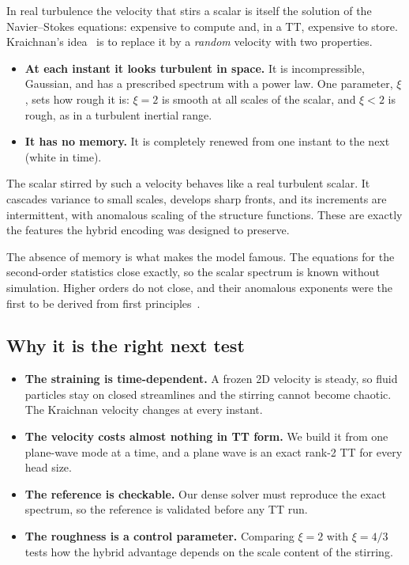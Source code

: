 \documentclass[aps,prfluids,reprint,onecolumn,amsmath,amssymb,nofootinbib,floatfix]{revtex4-2}
\begin{document}
In real turbulence the velocity that stirs a scalar is itself the solution of
the Navier--Stokes equations: expensive to compute and, in a TT, expensive to
store. Kraichnan's idea~\cite{Kraichnan1968,Kraichnan1994} is to replace it by a
\emph{random} velocity with two properties.
\begin{itemize}
\item \textbf{At each instant it looks turbulent in space.} It is incompressible,
      Gaussian, and has a prescribed spectrum with a power law. One parameter,
      $\xi$, sets how rough it is: $\xi=2$ is smooth at all scales of the
      scalar, and $\xi<2$ is rough, as in a turbulent inertial range.
\item \textbf{It has no memory.} It is completely renewed from one instant to
      the next (white in time).
\end{itemize}
The scalar stirred by such a velocity behaves like a real turbulent scalar. It
cascades variance to small scales, develops sharp fronts, and its increments
are intermittent, with anomalous scaling of the structure functions. These are
exactly the features the hybrid encoding was designed to preserve.

The absence of memory is what makes the model famous. The equations for the
second-order statistics close exactly, so the scalar spectrum is known without
simulation. Higher orders do not close, and their anomalous exponents were the
first to be derived from first principles~\cite{FGV2001,ShraimanSiggia2000}.

\subsection{Why it is the right next test}

\begin{itemize}
\item \textbf{The straining is time-dependent.} A frozen 2D velocity is steady,
      so fluid particles stay on closed streamlines and the stirring cannot
      become chaotic. The Kraichnan velocity changes at every instant.
\item \textbf{The velocity costs almost nothing in TT form.} We build it from
      one plane-wave mode at a time, and a plane wave is an exact rank-2 TT
      for every head size.
\item \textbf{The reference is checkable.} Our dense solver must reproduce the
      exact spectrum, so the reference is validated before any TT run.
\item \textbf{The roughness is a control parameter.} Comparing $\xi=2$ with
      $\xi=4/3$ tests how the hybrid advantage depends on the scale content of
      the stirring.
\end{itemize}
\end{document}
